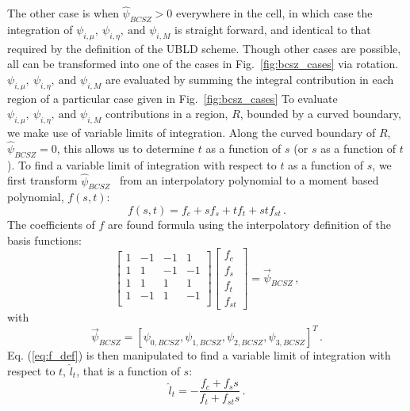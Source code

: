 \documentclass{mc2015}
\newcommand{\fig}[1]{Fig.~\ref{#1}}                      %
\newcommand{\benum}{\begin{equation}} 			%
\newcommand{\eenum}{\end{equation}}
\newcommand{\eqt}[1]{Eq. (\ref{#1})}  %
\newcommand{\BCSZH}{\ensuremath{\widehat{\psi}_{BCSZ}}}
\newcommand{\pec}{\, ,}
\newcommand{\pep}{\, .}
\begin{document}
The other case is when $\BCSZH > 0$ everywhere in the cell, in which case the integration of $\psi_{i,\mu},~\psi_{i,\eta},~\text{and }\psi_{i,M}$ is straight forward, and identical to that required by the definition of the UBLD scheme.
Though other cases are possible, all can be transformed into one of the cases in \fig{fig:bcsz_cases} via rotation.
$\psi_{i,\mu},~\psi_{i,\eta},~\text{and }\psi_{i,M}$ are evaluated by summing the integral contribution in  each region of a particular case given in \fig{fig:bcsz_cases}
To evaluate $\psi_{i,\mu},~\psi_{i,\eta},~\text{and }\psi_{i,M}$ contributions in a region, $R$, bounded by a curved boundary, we make use of variable limits of integration.
Along the curved boundary of $R$, $\BCSZH=0$, this allows us to determine $t$ as a function of $s$ (or $s$ as a function of $t$).  
To find a variable limit of integration with respect to $t$ as a function of $s$, we first transform \BCSZH~ from an interpolatory polynomial to a moment based polynomial, $f(s,t)$:
\benum
f(s,t) = f_c + s f_s + t f_t + st f_{st} \pep
\label{eq:f_def}
\eenum
The coefficients of $f$ are found formula using the interpolatory definition of the basis functions:
\benum
\left[ 
\begin{array}{cccc}
1 &	 -1	& -1 &  1    \\
1 &		1	& -1	&  -1		\\	
1 &	  1	&  1		&  1		\\
1 &		-1	& 1		&  -1		\\
\end{array}
\right]
\left[
\begin{array}{c}
f_c \\
f_s \\
f_t \\
f_{st} 
\end{array}
\right]
=\vec{\psi}_{BCSZ}
\pec
\eenum
with
\benum
\vec{\psi}_{BCSZ} = \left[ \psi_{0,BCSZ},
\psi_{1,BCSZ},
\psi_{2,BCSZ},
\psi_{3,BCSZ} \right]^T
\pep
\eenum
\eqt{eq:f_def} is then manipulated to find a variable limit of integration with respect to $t$, $\hat{l}_t$, that is a function of $s$:
\benum
\hat{l}_t  = -\frac{f_c + f_s s}{f_t + f_{st} s} \pep
\eenum
\end{document}
